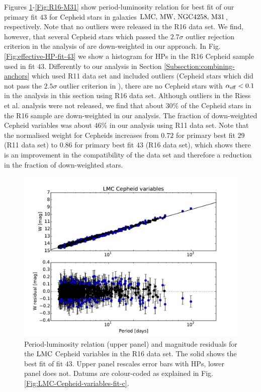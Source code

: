 Figures \ref{Fig:R16-LMC}-\ref{Fig:R16-M31} show period-luminosity relation for best fit of our primary fit $43$ for Cepheid stars in galaxies $\mathrm{LMC},\, \mathrm{MW},\, \mathrm{NGC4258},\, \mathrm{M31}$, respectively. Note that no outliers were released in the R16 data set. We find, however, that several Cepheid stars which passed the $2.7\sigma$ outlier rejection criterion in the analysis of \cite{Riess:2016jrr} are down-weighted in our approach. In Fig. \ref{Fig:effective-HP-fit-43} we show a histogram for HPs in the R16 Cepheid sample used in fit $43$. Differently to our analysis in Section \ref{Subsection:combining-anchors} which used R11 data set and included outliers (Cepheid stars which did not pass the $2.5\sigma$ outlier criterion in \cite{Riess:2011yx}), there are no Cepheid stars with $\alpha_{\mathrm{eff}}<0.1$ in the analysis in this section using R16 data set. Although outliers in the Riess et al. analysis \cite{Riess:2016jrr} were not released, we find that about $30\%$ of the Cepheid stars in the R16 sample are down-weighted in our analysis. The fraction of down-weighted Cepheid variables was about $46\%$ in our analysis using R11 data set. Note that the normalised weight for Cepheids increases from $0.72$ for primary best fit $29$ (R11 data set) to $0.86$ for primary best fit $43$ (R16 data set), which shows there is an improvement in the compatibility of the data set and therefore a reduction in the fraction of down-weighted stars.    

\begin{figure}[hbtp]
\centering
\includegraphics[scale=0.75]{figures/chapter-h0/effective_HP_cepheids_LMC_R16.pdf}
\caption{Period-luminosity relation (upper panel) and magnitude residuals for the $\mathrm{LMC}$ Cepheid variables in the R16 data set. The solid  shows the best fit of fit $43$. Upper panel rescales error bars with HPs, lower panel does not. Datums are colour-coded as explained in Fig. \ref{Fig:LMC-Cepheid-variables-fit-c}.}
\label{Fig:R16-LMC}
\end{figure}
  
